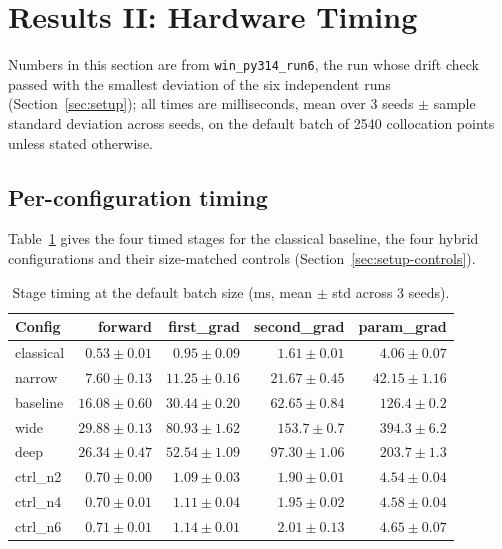 \section{Results II: Hardware Timing}
\label{sec:results-timing}

Numbers in this section are from \texttt{win\_py314\_run6}, the run whose drift check passed with the
smallest deviation of the six independent runs (Section~\ref{sec:setup}); all times are milliseconds, mean
over 3 seeds $\pm$ sample standard deviation across seeds, on the default batch of 2540 collocation points
unless stated otherwise.

\subsection{Per-configuration timing}
\label{sec:res-main}
Table~\ref{tab:main-timing} gives the four timed stages for the classical baseline, the four hybrid
configurations and their size-matched controls (Section~\ref{sec:setup-controls}).

\begin{table}[h]
\centering
\caption{Stage timing at the default batch size (ms, mean $\pm$ std across 3 seeds).}
\label{tab:main-timing}
\small
\begin{tabular}{@{}lrrrr@{}}
\toprule
Config & forward & first\_grad & second\_grad & param\_grad \\
\midrule
classical & $0.53\pm0.01$  & $0.95\pm0.09$  & $1.61\pm0.01$   & $4.06\pm0.07$ \\
narrow    & $7.60\pm0.13$  & $11.25\pm0.16$ & $21.67\pm0.45$  & $42.15\pm1.16$ \\
baseline  & $16.08\pm0.60$ & $30.44\pm0.20$ & $62.65\pm0.84$  & $126.4\pm0.2$ \\
wide      & $29.88\pm0.13$ & $80.93\pm1.62$ & $153.7\pm0.7$   & $394.3\pm6.2$ \\
deep      & $26.34\pm0.47$ & $52.54\pm1.09$ & $97.30\pm1.06$  & $203.7\pm1.3$ \\
\addlinespace
ctrl\_n2  & $0.70\pm0.00$  & $1.09\pm0.03$  & $1.90\pm0.01$   & $4.54\pm0.04$ \\
ctrl\_n4  & $0.70\pm0.01$  & $1.11\pm0.04$  & $1.95\pm0.02$   & $4.58\pm0.04$ \\
ctrl\_n6  & $0.71\pm0.01$  & $1.14\pm0.01$  & $2.01\pm0.13$   & $4.65\pm0.07$ \\
\bottomrule
\end{tabular}
\end{table}

